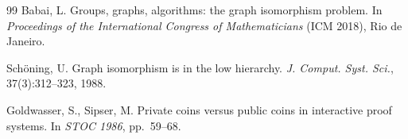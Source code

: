 \documentclass[11pt,a4paper]{amsart}
\theoremstyle{plain}
\theoremstyle{definition}
\begin{document}
\begin{thebibliography}{99}
Babai, L.
\newblock Groups, graphs, algorithms: the graph isomorphism problem.
\newblock In \emph{Proceedings of the International Congress of Mathematicians} (ICM 2018), Rio de Janeiro.

Sch\"oning, U.
\newblock Graph isomorphism is in the low hierarchy.
\newblock \emph{J. Comput. Syst. Sci.}, 37(3):312--323, 1988.

Goldwasser, S., Sipser, M.
\newblock Private coins versus public coins in interactive proof systems.
\newblock In \emph{STOC 1986}, pp.~59--68.

\end{thebibliography}
\end{document}
